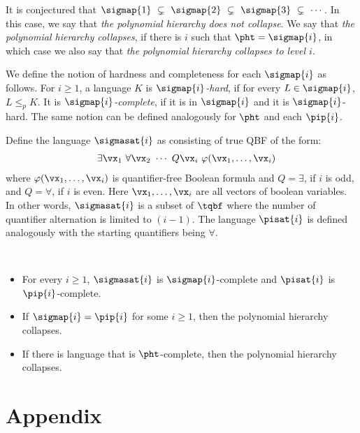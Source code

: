\documentclass[11pt, a4paper]{article}
\begin{document}
It is conjectured that 
$\sigmap {1}\ \subsetneq\ \sigmap {2}\ \subsetneq\ \sigmap {3} \ \subsetneq \ \cdots$.
In this case, we say that {\em the polynomial hierarchy does not collapse}.
We say that {\em the polynomial hierarchy collapses},
if there is $i$ such that $\pht = \sigmap {i}$,
in which case we also say that {\em the polynomial hierarchy collapses to level $i$}.


We define the notion of hardness and completeness for each $\sigmap {i}$ as follows. 
For $i\geq 1$, a language $K$ is {\em $\sigmap {i}$-hard}, if for every $L \in \sigmap {i}$, $L \leq_p K$. 
It is {\em $\sigmap {i}$-complete}, if it is in $\sigmap {i}$ and it is $\sigmap {i}$-hard. 
The same notion can be defined analogously for $\pht$ and each $\pip {i}$.


Define the language $\sigmasat {i}$ as consisting of true QBF of the form:
\begin{eqnarray*}
& & \exists \vx_1 \ \forall \vx_2 \ \cdots \ Q \vx_i\ \varphi(\vx_1,\ldots,\vx_i)
\end{eqnarray*}
where $\varphi(\vx_1,\ldots,\vx_i)$ is quantifier-free Boolean formula and $Q=\exists$, if $i$ is odd, and $Q=\forall$, if $i$ is even.
Here $\vx_1,\ldots,\vx_i$ are all vectors of boolean variables.
In other words, $\sigmasat {i}$ is a subset of $\tqbf$ where the number of quantifier alternation is limited to $(i-1)$.
The language $\pisat {i}$ is defined analogously with the starting quantifiers being $\forall$.

\begin{theorem}
\label{theo:ph}~
\begin{itemize}
\item 
For every $i\geq 1$,
$\sigmasat {i}$ is $\sigmap {i}$-complete and $\pisat {i}$ is $\pip {i}$-complete.
\item
If $\sigmap {i} = \pip {i}$ for some $i\geq 1$, then the polynomial hierarchy collapses.
\item
If there is language that is $\pht$-complete, then the polynomial hierarchy collapses.
\end{itemize}

\end{theorem}



\appendix

\section*{Appendix}
\end{document}
